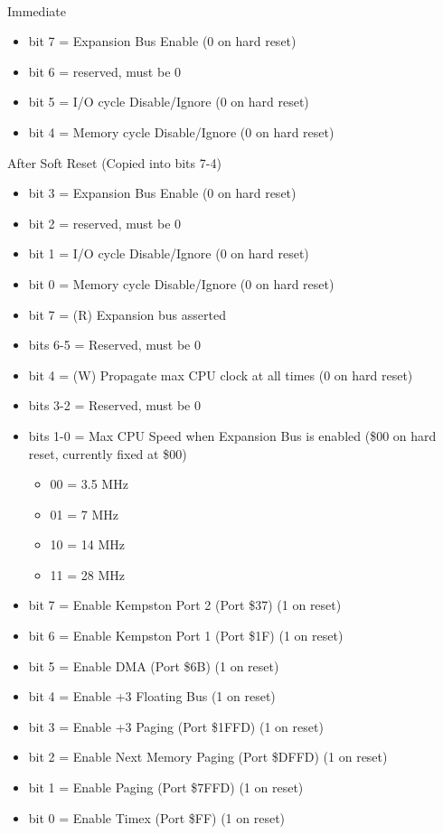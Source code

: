 \\
Immediate
\begin{itemize}
\item bit 7 = Expansion Bus Enable (0 on hard reset)
\item bit 6 = reserved, must be 0
\item bit 5 = I/O cycle Disable/Ignore  (0 on
  hard reset)
\item bit 4 = Memory cycle Disable/Ignore  (0 on
  hard reset)
\end{itemize}
After Soft Reset (Copied into bits 7-4)
\begin{itemize}
\item bit 3 = Expansion Bus Enable (0 on hard reset)
\item bit 2 = reserved, must be 0
\item bit 1 = I/O cycle Disable/Ignore  (0 on
  hard reset)
\item bit 0 = Memory cycle Disable/Ignore  (0 on
  hard reset)
\end{itemize}

\begin{itemize}
\item bit 7 = (R) Expansion bus  asserted
\item bits 6-5 = Reserved, must be 0
\item bit 4 = (W) Propagate max CPU clock at all times (0 on hard
  reset)
\item bits 3-2 = Reserved, must be 0
\item bits 1-0 = Max CPU Speed when Expansion Bus is enabled (\$00 on
  hard reset, currently fixed at \$00)
  \begin{itemize}
  \item 00 = 3.5 MHz
  \item 01 = 7 MHz
  \item 10 = 14 MHz
  \item 11 = 28 MHz
  \end{itemize}
\end{itemize}

\begin{itemize}
\item bit 7 = Enable Kempston Port 2 (Port \$37) (1 on reset)
\item bit 6 = Enable Kempston Port 1 (Port \$1F) (1 on reset)
\item bit 5 = Enable DMA (Port \$6B) (1 on reset)
\item bit 4 = Enable +3 Floating Bus (1 on reset)
\item bit 3 = Enable +3 Paging (Port \$1FFD) (1 on reset)
\item bit 2 = Enable Next Memory Paging (Port \$DFFD) (1 on reset)
\item bit 1 = Enable Paging (Port \$7FFD) (1 on reset)
\item bit 0 = Enable Timex (Port \$FF) (1 on reset)
\end{itemize}

